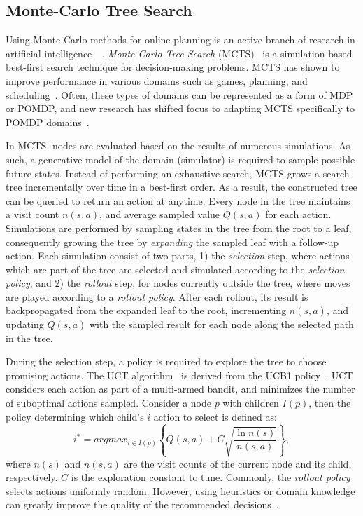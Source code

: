 \documentclass[conference]{IEEEtran}
\begin{document}
\subsection{Monte-Carlo Tree Search}
\label{sub:mcts}


Using Monte-Carlo methods for online planning is an active branch of research in artificial intelligence~\cf~\cite{browne2012survey}. {\it Monte-Carlo Tree Search} (MCTS)~\cite{coulom2007efficient,kocsis2006bandit} is a simulation-based best-first search technique for decision-making problems. MCTS has shown to improve performance in various domains such as games, planning, and scheduling~\cite{browne2012survey}. Often, these types of domains can be represented as a form of MDP or POMDP, and new research has shifted focus to adapting MCTS specifically to POMDP domains~\cite{silver2010monte,Feldman12BRUE}. 

In MCTS, nodes are evaluated based on the results of numerous simulations. As such, a generative model of the domain (\ie simulator) is required to sample possible future states. Instead of performing an exhaustive search, MCTS grows a search tree incrementally over time in a best-first order. As a result, the constructed tree can be queried to return an action at anytime. Every node in the tree maintains a visit count $n(s,a)$, and average sampled value $Q(s,a)$ for each action. Simulations are performed by sampling states in the tree from the root to a leaf, consequently growing the tree by \emph{expanding} the sampled leaf with a follow-up action. Each simulation consist of two parts, 1) the \emph{selection} step, where actions which are part of the tree are selected and simulated according to the {\it selection policy}, and 2) the \emph{rollout} step, for nodes currently outside the tree, where moves are played according to a \emph{rollout policy}. After each rollout, its result is backpropagated from the expanded leaf to the root, incrementing $n(s,a)$, and updating $Q(s,a)$ with the sampled result for each node along the selected path in the tree.

During the selection step, a policy is required to explore the tree to choose promising actions. The UCT algorithm~\cite{kocsis2006bandit} is derived from the UCB1 policy~\cite{auer2002using}. UCT considers each action as part of a multi-armed bandit, and minimizes the number of suboptimal actions sampled. Consider a node $p$ with children $I(p)$, then the policy determining which child's $i$ action to select is defined as:
\begin{equation}
\label{eq:uct}
i^* = argmax_{i \in I(p)}\left\{ Q(s,a) + C \sqrt{ \frac{\ln{n(s)}}{n(s, a)}}\right\},
\end{equation}
where $n(s)$ and $n(s, a)$ are the visit counts of the current node and its child, respectively. $C$ is the exploration constant to tune. Commonly, the \emph{rollout policy} selects actions uniformly random. However, using heuristics or domain knowledge can greatly improve the quality of the recommended decisions~\cite{browne2012survey}.
\end{document}
